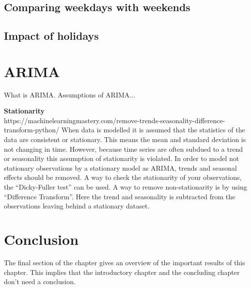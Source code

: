 \subsection{Comparing weekdays with weekends}



\subsection{Impact of holidays}



\section{ARIMA}
What is ARIMA. 
Assumptions of ARIMA...

\textbf{Stationarity}\\
 https://machinelearningmastery.com/remove-trends-seasonality-difference-transform-python/
When data is modelled it is assumed that the statistics of the data are consistent or stationary. This means the mean and standard deviation is not changing in time. However, because time series are often subdued to a trend or seasonality this assumption of stationarity is violated. In order to model not stationary observations by a stationary model as ARIMA, trends and seasonal effects should be removed. A way to check the stationarity of your observations, the ``Dicky-Fuller test'' can be used.
A way to remove non-stationarity is by using ``Difference Transform''. Here the trend and seasonality is subtracted from the observations leaving behind a stationary dataset.


\section{Conclusion}
The final section of the chapter gives an overview of the important results
of this chapter. This implies that the introductory chapter and the
concluding chapter don't need a conclusion.




